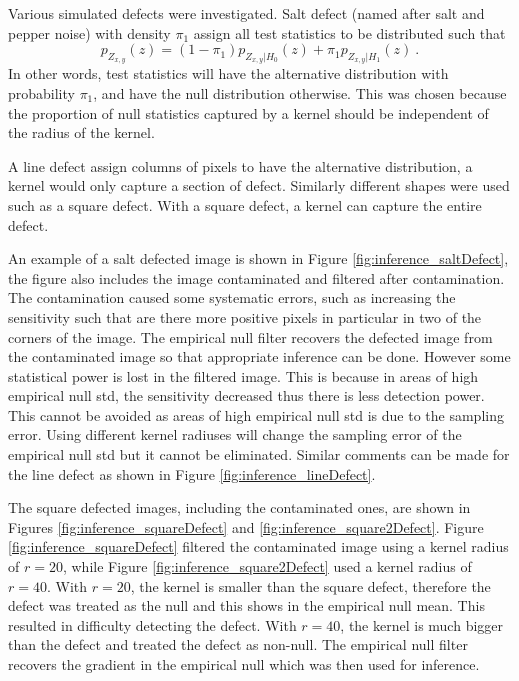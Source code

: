 Various simulated defects were investigated. Salt defect (named after salt and pepper noise) with density $\pi_1$ assign all test statistics to be distributed such that
\begin{equation}
  p_{Z_{x,y}}(z)=(1-\pi_1)p_{Z_{x,y}|H_0}(z) + \pi_1 p_{Z_{x,y}|H_1}(z) \ .
\end{equation}
In other words, test statistics will have the alternative distribution with probability $\pi_1$, and have the null distribution otherwise. This was chosen because the proportion of null statistics captured by a kernel should be independent of the radius of the kernel.

A line defect assign columns of pixels to have the alternative distribution, a kernel would only capture a section of defect. Similarly different shapes were used such as a square defect. With a square defect, a kernel can capture the entire defect.

An example of a salt defected image is shown in Figure \ref{fig:inference_saltDefect}, the figure also includes the image contaminated and filtered after contamination. The contamination caused some systematic errors, such as increasing the sensitivity such that are there more positive pixels in particular in two of the corners of the image. The empirical null filter recovers the defected image from the contaminated image so that appropriate inference can be done. However some statistical power is lost in the filtered image. This is because in areas of high empirical null std, the sensitivity decreased thus there is less detection power. This cannot be avoided as areas of high empirical null std is due to the sampling error. Using different kernel radiuses will change the sampling error of the empirical null std but it cannot be eliminated. Similar comments can be made for the line defect as shown in Figure \ref{fig:inference_lineDefect}.

The square defected images, including the contaminated ones, are shown in Figures \ref{fig:inference_squareDefect} and \ref{fig:inference_square2Defect}. Figure \ref{fig:inference_squareDefect} filtered the contaminated image using a kernel radius of $r=20$, while Figure \ref{fig:inference_square2Defect} used a kernel radius of $r=40$. With $r=20$, the kernel is smaller than the square defect, therefore the defect was treated as the null and this shows in the empirical null mean. This resulted in difficulty detecting the defect. With $r=40$, the kernel is much bigger than the defect and treated the defect as non-null. The empirical null filter recovers the gradient in the empirical null which was then used for inference.

